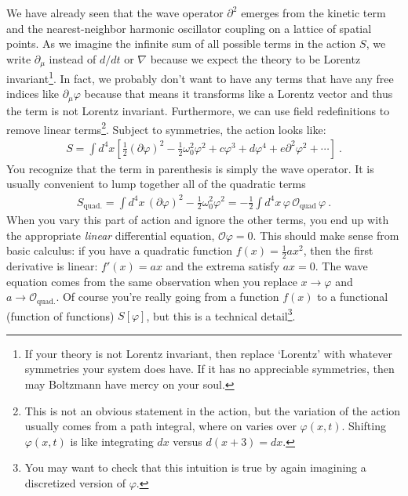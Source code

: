 We have already seen that the wave operator $\partial^2$ emerges from the kinetic term and the nearest-neighbor harmonic oscillator coupling on a lattice of spatial points. As we imagine the infinite sum of all possible terms in the action $S$, we write $\partial_\mu$ instead of $d/dt$ or $\nabla$ because we expect the theory to be Lorentz invariant\footnote{If your theory is not Lorentz invariant, then replace `Lorentz' with whatever symmetries your system does have. If it has no appreciable symmetries, then may Boltzmann have mercy on your soul.}.  In fact, we probably don't want to have any terms that have any free indices like $\partial_\mu \varphi$ because that means it transforms like a Lorentz vector and thus the term is not Lorentz invariant. Furthermore, we can use field redefinitions to remove linear terms\footnote{This is not an obvious statement in the action, but the variation of the action usually comes from a path integral, where on varies over $\varphi(x,t)$. Shifting $\varphi(x,t)$ is like integrating $dx$ versus $d(x+3) = dx$.}. Subject to symmetries, the action looks like:
\begin{align}
S = \int d^4x \left[\frac{1}{2}
\left(\partial \varphi\right)^2
- \frac{1}{2}\omega_0^2 \varphi^2
+ c\varphi^3 + d\varphi^4 + e\partial^2 \varphi^2 + \cdots \right]	 \ .
\end{align}
You recognize that the term in parenthesis is simply the wave operator. It is usually convenient to lump together all of the quadratic terms
\begin{align}
	S_\text{quad.} 
	= 
	\int d^4x \, \left(\partial \varphi\right)^2
	- \frac{1}{2}\omega_0^2 \varphi^2
	=
	-
	\frac{1}{2}
	\int d^4x \, \varphi \,\mathcal{O}_\text{quad}\,\varphi \ .
\end{align}
When you vary this part of action and ignore the other terms, you end up with the appropriate \emph{linear} differential equation, $\mathcal O \varphi = 0$. This should make sense from basic calculus: if you have a quadratic function $f(x)=\frac{1}{2}ax^2$, then the first derivative is linear: $f'(x)=ax$ and the extrema satisfy $ax=0$. The wave equation comes from the same observation when you replace $x\to \varphi$ and $a\to \mathcal O_\text{quad.}$. Of course you're really going from a function $f(x)$ to a functional (function of functions) $S[\varphi]$, but this is a technical detail\footnote{You may want to check that this intuition is true by again imagining a discretized version of $\varphi$.}.


